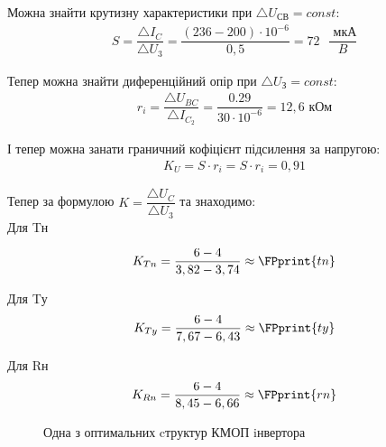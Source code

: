 \documentclass[a4paper,14pt]{extreport}
\begin{document}
\newpage

\FPeval{}

Можна знайти  крутизну характеристики при $\triangle U_{\text{СВ}} = const$:
\begin{align*}
  S = \dfrac{\triangle I_C}{\triangle U_{\text{3}}} =  \dfrac{(236-200)\cdot10^{-6}}{0,5} = 72 \text{ } \dfrac{\text{ мкА}}{B}
\end{align*}

Тепер можна знайти диференційний опір при $\triangle U_{\text{З}} = const$:
\FPeval{}
\begin{align*}
  r_i = \dfrac{\triangle U_{BC}}{\triangle I_{C_2}} = \dfrac{0.29}{30\cdot 10^{-6}} =  12,6\text{ кОм}
\end{align*}

І тепер можна занати граничний кофіцієнт підсилення за напругою:
\FPeval{}
\begin{align*}
 K_U = S\cdot r_i = S\cdot r_i =  0,91
\end{align*}











Тепер за формулою $K = \dfrac{\triangle U_C}{\triangle U_3}$ та знаходимо:\\

Для Tн
\FPeval{}

\FPeval{}
\begin{align*}
  K_{Tn} = \dfrac{6-4}{3,82-3,74} \approx \FPprint{tn}
\end{align*}

Для Tу
\FPeval{}
\begin{align*}
  K_{Ty} = \dfrac{6-4}{7,67-6,43} \approx \FPprint{ty}
\end{align*}

Для Rн
\FPeval{}
\begin{align*}
  K_{Rn} = \dfrac{6-4}{8,45-6,66} \approx \FPprint{rn}
\end{align*}



\newpage
\begin{figure}[h]
\caption{ Одна з оптимальних cтруктур КМОП iнвертора}
\end{figure}
\end{document}
